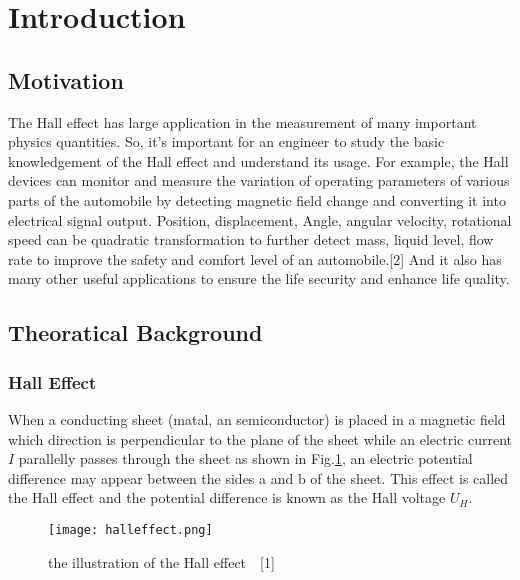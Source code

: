 \documentclass[12pt,a4paper]{article}
\begin{document}
\section{Introduction}
\subsection{Motivation}
The Hall effect has large application in the measurement of many important physics quantities. So, it's important for an engineer to study the basic knowledgement of the Hall effect and understand its usage. For example, the Hall devices can monitor and measure the variation of operating parameters of various parts of the automobile by detecting magnetic field change and converting it into electrical signal output. Position, displacement, Angle, angular velocity, rotational speed can be quadratic transformation to further detect mass, liquid level, flow rate to improve the safety and comfort level of an automobile.[2] And it also has many other useful applications to ensure the life security and enhance life quality.

\subsection{Theoratical Background}
\subsubsection{Hall Effect}
When a conducting sheet (matal, an semiconductor) is placed in a magnetic field which direction is perpendicular to the plane of the sheet while an electric current $I$ parallelly passes through the sheet as shown in Fig.\ref{halleffect}, an electric potential difference may appear between the sides a and b of the sheet. This effect is called the Hall effect and the potential difference is known as the Hall voltage $U_H$. \par

\begin{figure}[H]
    \centering
    \texttt{[image: halleffect.png]}
    \caption{the illustration of the Hall effect~~[1]}
    \label{halleffect}
\end{figure}
\end{document}
